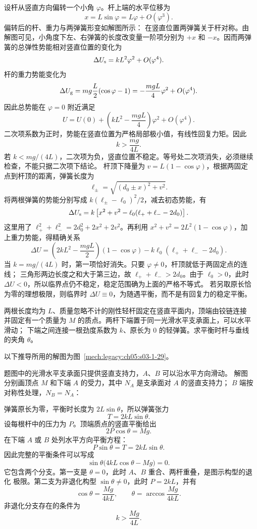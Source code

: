 {\begin{xesolution}
设杆从竖直方向偏转一个小角 $\varphi$。杆上端的水平位移为
\[
  x=L\sin\varphi=L\varphi+O(\varphi^3).
\]
\Needspace{66mm}
偏转后的杆、重力与两弹簧形变如解图所示：
\soldiagOneTwentyEight
在竖直位置两弹簧关于杆对称。由解图可见，小角度下左、右弹簧的长度改变量一阶项分别为
$+x$ 和 $-x$。因而两弹簧的总弹性势能相对竖直位置的变化为
\[
  \Delta U_{\rm s}=kL^2\varphi^2+O(\varphi^4).
\]
杆的重力势能变化为
\[
  \Delta U_{\rm g}=mg\frac L2(\cos\varphi-1)
  =-\frac{mgL}{4}\varphi^2+O(\varphi^4).
\]
因此总势能在 $\varphi=0$ 附近满足
\[
  U=U(0)+\left(kL^2-\frac{mgL}{4}\right)\varphi^2+O(\varphi^4).
\]
二次项系数为正时，势能在竖直位置为严格局部极小值，有线性回复力矩。因此
\[
  \boxed{k>\frac{mg}{4L}}.
\]
若 $k<mg/(4L)$，二次项为负，竖直位置不稳定。等号处二次项消失，必须继续检查，不能只据二次项下结论。
杆顶下降量为 $v=L(1-\cos\varphi)$，根据两固定点到杆顶的距离，弹簧长度为
\[
 \ell_\pm=\sqrt{(d_0\pm x)^2+v^2}.
\]
将两根弹簧的势能分别写成 $k(\ell_\pm-\ell_0)^2/2$，减去初态势能，有
\[
 \Delta U_{\rm s}
 =k\left[x^2+v^2-\ell_0(\ell_++\ell_--2d_0)\right].
\]
这里用了 $\ell_+^2+\ell_-^2=2d_0^2+2x^2+2v^2$。再利用
$x^2+v^2=2L^2(1-\cos\varphi)$，加上重力势能，得精确关系
\[
 \Delta U=\left(2kL^2-\frac{mgL}{2}\right)(1-\cos\varphi)
 -k\ell_0(\ell_++\ell_--2d_0).
\]
当 $k=mg/(4L)$ 时，第一项恰好消失。只要 $\varphi\ne0$，杆顶就低于两固定点的连线；
三角形两边长度之和大于第三边，故 $\ell_++\ell_->2d_0$。由于 $\ell_0>0$，此时
$\Delta U<0$，所以临界点仍不稳定，稳定范围确为上面的严格不等式。
若另取原长恰为零的理想极限，则临界时 $\Delta U\equiv0$，为随遇平衡，而不是有回复力的稳定平衡。
\end{xesolution}

\begin{origexamplebox}{}\label{ch05:ex:s03-1-29}
两根长度均为 $L$、质量忽略不计的刚性轻杆固定在竖直平面内，顶端由铰链连接
并固定有一个质量为 $M$ 的质点。两杆下端置于同一光滑水平支承面上，可以水平滑动；
下端之间连接一根劲度系数为 $k$、原长为 0 的轻弹簧。求平衡时杆与垂线的夹角 $\theta$。
\end{origexamplebox}

\begin{xesolution}
以下推导所用的解图为图~\ref{mech:legacy:ch05:s03-1-29}。

题图中的光滑水平支承面只提供竖直支持力，$A$、$B$ 可以沿水平方向滑动。
解图分别画顶点 $M$ 和下端 $A$ 的受力，其中 $N_A$ 是支承面对 $A$ 的竖直支持力；
$B$ 端按对称性处理，$N_B=N_A$：
\soldiagOneTwentyNine

弹簧原长为零，平衡时长度为 $2L\sin\theta$，所以弹簧张力
\[
  T=2kL\sin\theta.
\]
设每根杆中的压力为 $P$。顶端质点的竖直平衡给出
\[
  2P\cos\theta=Mg.
\]
在下端 $A$ 或 $B$ 处列水平方向平衡方程：
\[
  P\sin\theta=T=2kL\sin\theta.
\]
因此完整的平衡条件可以写成
\[
  \sin\theta\bigl(4kL\cos\theta-Mg\bigr)=0.
\]
它包含两个分支。第一支是 $\theta=0$，此时 $A$、$B$ 重合、两杆重叠，是图示构型的退化
极限。第二支为非退化构型 $\sin\theta\ne0$，此时 $P=2kL$，并有
\[
  \boxed{\cos\theta=\frac{Mg}{4kL}},
  \qquad
  \boxed{\theta=\arccos\frac{Mg}{4kL}}.
\]
非退化分支存在的条件为
\[
  \boxed{k>\frac{Mg}{4L}}.
\]


\end{xesolution}}
